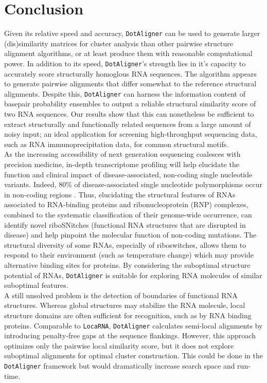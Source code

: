 \documentclass{bmcart}
\newcommand\dotaligner{\texttt{DotAligner}}
\newcommand\locarna{\texttt{LocaRNA}}
\begin{document}
\section*{Conclusion}
Given its relative speed and accuracy, \dotaligner{} can be used to generate
larger (dis)similarity matrices for cluster analysis than other pairwise
structure alignment algorithms, or at least produce them with reasonable
computational power. In addition to its speed, \dotaligner{}'s strength lies in
it's capacity to accurately score structurally homoglous RNA sequences. The
algorithm appears to generate pairwise alignments that differ somewhat to the
reference structural alignments. Despite this, \dotaligner{} can harness the
information content of basepair probability ensembles to output a reliable
structural similarity score of two RNA sequences. Our results show that this
can nonetheless be sufficient to extract structurally and functionally related
sequences from a large amount of noisy input; an ideal application for
screening high-throughput sequencing data, such as RNA immunoprecipitation
data, for common structural motifs. \\

As the increasing accessibility of next generation sequencing coalesces with
precision medicine, in-depth transcriptome profiling will help elucidate the
function and clinical impact of disease-associated, non-coding single
nucleotide variants. Indeed, 80\% of disease-associated single nucleotide
polymorphisms occur in non-coding regions
\cite{hindorff2009potential,ritchie2014functional}. Thus, elucidating the
structural features of RNAs associated to RNA-binding proteins and
ribonucleoprotein (RNP) complexes, combined to the systematic classification of
their genome-wide occurrence, can identify novel riboSNitches (functional RNA
structures that are disrupted in disease) and help pinpoint the molecular
function of non-coding mutations. The structural diversity of some RNAs,
especially of riboswitches, allows them to respond to their environment (such
as temperature change) which may provide alternative binding sites for
proteins. By considering the suboptimal structure potential of RNAs, \dotaligner{}
is suitable for exploring RNA molecules of similar suboptimal features. \\

A still unsolved problem is the detection of boundaries of functional RNA
structures. Whereas global structures may stabilize the RNA molecule, local
structure domains are often sufficient for recognition, such as by RNA binding
proteins. Comparable to \locarna{}, \dotaligner{} calculates semi-local
alignments by introducing penalty-free gaps at the sequence flankings. However,
this approach optimizes only the pairwise local similarity score, but it does
not explore suboptimal alignments for optimal cluster construction. This could
be done in the \dotaligner{} framework but would dramatically increase search
space and run-time. \\
\end{document}
